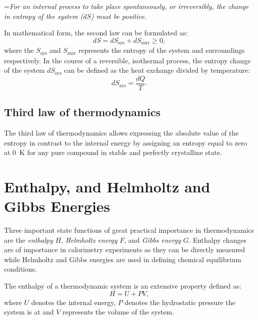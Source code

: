\hangindent=\parindent \emph{For an internal process to take place spontaneously, or irreversibly, the change in entropy of the system ($dS$) must be positive.}

\noindent In mathematical form, the second law can be formulated as:
\begin{equation}\label{eqn:slot}
    dS = dS_\text{sys} + dS_\text{surr} \geq 0,
\end{equation}
where the $S_\text{sys}$ and $S_\text{surr}$ represents the entropy of the system and surroundings respectively.
In the course of a reversible, isothermal process, the entropy change of the system $dS_\text{sys}$   can be defined as the heat exchange divided by temperature:
\begin{equation}\label{eqn:slotrev}
    dS_\text{sys} = \frac{dQ}{T}.
\end{equation}

\subsection{Third law of thermodynamics}
The third law of thermodynamics allows expressing the absolute value of the entropy in contrast to the internal energy by assigning an entropy equal to zero at \SI{0}{\kelvin} for any pure compound in stable and perfectly crystalline state.

\section{Enthalpy, and Helmholtz and Gibbs Energies}
    Three important state functions of great practical importance in thermodynamics are the \emph{enthalpy} $H$, \emph{Helmholtz energy} $F$, and \emph{Gibbs energy} $G$. Enthalpy changes are of importance in calorimetry experiments as they can be directly measured while Helmholtz and Gibbs energies are used in defining chemical equilibrium conditions.

    The enthalpy of a thermodynamic system is an extensive property defined as:
    \begin{equation}
        H = U + PV,
    \end{equation}
    where $U$ denotes the internal energy, $P$ denotes the hydrostatic pressure the system is at and $V$ represents the volume of the system.

